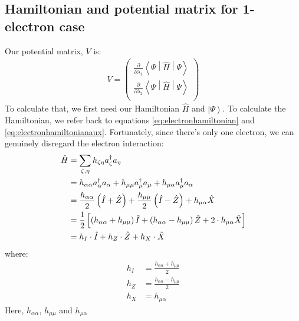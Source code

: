 \documentclass{aux/ttuthes2007}
\newcommand{\ket}[1]{\ensuremath{\left|#1\right\rangle}}
\newcommand{\sandwich}[3]{\left< #1 \middle\vert #2 \middle\vert #3 \right>}
\newcommand{\paren}[1]{\left( #1 \right)}
\newcommand{\pd}[1]{\frac{\partial}{\partial #1}}
\newcommand{\anio}[1]{a_{\oo{#1}}}
\newcommand{\aniu}[1]{a_{\uo{#1}}}
\newcommand{\anig}[1]{a_{\go{#1}}}
\newcommand{\creo}[1]{a^\dagger_{\oo{#1}}}
\newcommand{\creu}[1]{a^\dagger_{\uo{#1}}}
\newcommand{\creg}[1]{a^\dagger_{\go{#1}}}
\newcommand{\uo}[1]{
		\IfEqCase{#1}{
			{0}{\mu}
			{1}{\nu}
			{2}{\xi}
		}[\PackageError{uo}{Undefined option to uo: #1}{}]
}
\newcommand{\oo}[1]{
		\IfEqCase{#1}{
			{0}{\alpha}
			{1}{\beta}
			{2}{\gamma}
		}[\PackageError{unocorb}{Undefined option to unuo: #1}{}]
}
\newcommand{\go}[1]{
		\IfEqCase{#1}{
			{0}{\zeta}
			{1}{\eta}
			{2}{\iota}
			{3}{\kappa}
		}[\PackageError{unocorb}{Undefined option to go: #1}{}]
}
\begin{document}
\subsection{\textbf{Hamiltonian and potential matrix for 1-electron case}}

Our potential matrix, $V$ is:
%
\begin{equation*}
	\begin{split}
		V = \begin{pmatrix}
			\pd {\lambda_1} \sandwich {\Psi}{\hat H}{\Psi}\\
			\pd {\lambda_2} \sandwich {\Psi}{\hat H}{\Psi}\\
		\end{pmatrix}
	\end{split}
\end{equation*}
%
To calculate that, we first need our Hamiltonian $\hat H$ and $\ket \Psi$. To calculate the Hamiltonian, we refer back to equations \ref{eq:electronhamiltonian} and \ref{eq:electronhamiltonianaux}. Fortunately, since there's only one electron, we can genuinely disregard the electron interaction:
%
\begin{equation*}
	\begin{split}
	\hat H  &= \sum_{\go 0, \go 1}h_{\go 0 \go 1}\creg 0 \anig 1 \\
		&= {h_{\alpha\alpha}} \creo 0 \anio 0
		+ {h_{\mu\mu}} \creu 0 \aniu 0
		+ h_{\mu\alpha} \creu 0 \anio 0 
%
		\\
%
		&= \frac{h_{\alpha\alpha}}{2} \paren{\hat I + \hat Z}
		+ \frac{h_{\mu\mu}}{2} \paren{\hat I - \hat Z}
		+ h_{\mu\alpha} \hat X
%
	\\
%
		&= 	\frac{1}{2} \left[ 
			\paren{h_{\alpha\alpha} + h_{\mu\mu}} \hat I 
		+	\paren{h_{\alpha\alpha} - h_{\mu\mu}} \hat Z
		+ 	2 \cdot h_{\mu\alpha} \hat X
	\right]
%
	\\
%
		&=	h_{I} \cdot \hat I 
		+	h_{Z} \cdot \hat Z
		+	h_{X} \cdot \hat X
	\end{split}
\end{equation*}
%
where:
%
\begin{equation*}
	\begin{split}
			h_{I}
		&=	\frac{h_{\alpha\alpha} + h_{\mu\mu}} 2
%
	\\
%
			h_{Z}
		&=	\frac{h_{\alpha\alpha} - h_{\mu\mu}} 2
%
	\\
%
			h_{X}
		&= 	h_{\mu\alpha}
%
	\end{split}
\end{equation*}
%
Here,
$
h_{\alpha\alpha}$, $h_{\mu\mu}$ and $h_{\mu\alpha}$
\end{document}
